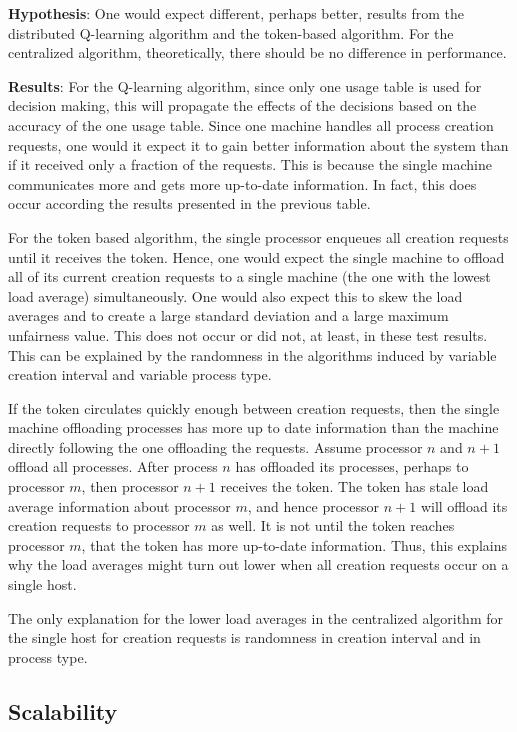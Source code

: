\documentclass{report}
\begin{document}
\textbf{Hypothesis}: One would expect different, perhaps better, results
from the distributed Q-learning algorithm and the token-based algorithm.
For the centralized algorithm, theoretically, there should be no difference
in performance.

\textbf{Results}: For the Q-learning algorithm, since only one usage table
is used for decision making, this will propagate the effects of the
decisions based on the accuracy of the one usage table.  Since one machine
handles all process creation requests, one would it expect it to gain better
information about the system than if it received only a fraction of the
requests.  This is because the single machine communicates more and gets
more up-to-date information.  In fact, this does occur according the results
presented in the previous table.

For the token based algorithm, the single processor enqueues all creation
requests until it receives the token.  Hence, one would expect the single
machine to offload all of its current creation requests to a single machine
(the one with the lowest load average) simultaneously.  One would also
expect this to skew the load averages and to create a large standard
deviation and a large maximum unfairness value.  This does not occur or did
not, at least, in these test results.  This can be explained by the
randomness in the algorithms induced by variable creation interval and
variable process type.

If the token circulates quickly enough between creation requests,
then the single machine offloading processes has more up to date information
than the machine directly following the one offloading the requests.  Assume
processor $n$ and $n+1$ offload all processes.  After process $n$ has
offloaded its processes, perhaps to processor $m$, then processor $n+1$
receives the token.  The token has stale load average information about
processor $m$, and hence processor $n+1$ will offload its creation requests
to processor $m$ as well.  It is not until the token reaches processor $m$,
that the token has more up-to-date information.  Thus, this explains why the
load averages might turn out lower when all creation requests occur on a
single host.

The only explanation for the lower load averages in the centralized
algorithm for the single host for creation requests is randomness in
creation interval and in process type.


\subsection{Scalability}
\end{document}
